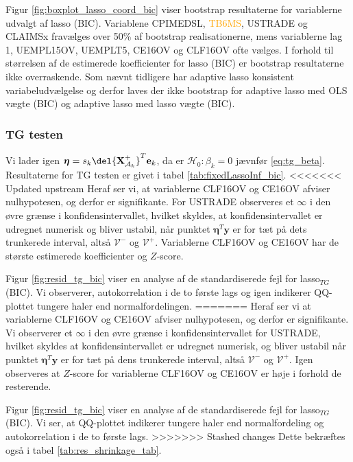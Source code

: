 Figur \ref{fig:boxplot_lasso_coord_bic} viser bootstrap resultaterne for variablerne udvalgt af lasso (BIC).
Variablene \textcolor{cadetblue2}{CPIMEDSL}, \textcolor{orange}{TB6MS}, \textcolor{blue3}{USTRADE} og \textcolor{blue3}{CLAIMSx} fravælges over 50\% af bootstrap realisationerne, mens variablerne \textcolor{blue3}{lag 1}, \textcolor{blue3}{UEMPL15OV}, \textcolor{blue3}{UEMPLT5}, \textcolor{blue3}{CE16OV} og \textcolor{blue3}{CLF16OV} ofte vælges.
I forhold til størrelsen af de estimerede koefficienter for lasso (BIC) er bootstrap resultaterne ikke overraskende. 
Som nævnt tidligere har adaptive lasso konsistent variabeludvælgelse og derfor laves der ikke bootstrap for adaptive lasso med OLS vægte (BIC) og adaptive lasso med lasso vægte (BIC). 

\subsubsection{TG testen}
Vi lader igen $\boldsymbol{\eta} = s_k \del{\textbf{X}^+_{\mathcal{A}_k}}^T \mathbf{e}_k$, da er $\mathcal{H}_0: \beta_k = 0$ jævnfør \eqref{eq:tg_beta}. 
Resultaterne for TG testen er givet i tabel \ref{tab:fixedLassoInf_bic}.
<<<<<<< Updated upstream
Heraf ser vi, at variablerne \textcolor{blue3}{CLF16OV} og \textcolor{blue3}{CE16OV} afviser nulhypotesen, og derfor er signifikante.
For \textcolor{blue3}{USTRADE} observeres et $\infty$ i den øvre grænse i konfidensintervallet, hvilket skyldes, at konfidensintervallet er udregnet numerisk og bliver ustabil, når punktet $\boldsymbol\eta^T \mathbf{y}$ er for tæt på dets trunkerede interval, altså $\mathcal{V}^-$ og $\mathcal{V}^+$. 
Variablerne \textcolor{blue3}{CLF16OV} og \textcolor{blue3}{CE16OV} har de største estimerede koefficienter og $Z$-score.

Figur \ref{fig:resid_tg_bic} viser en analyse af de standardiserede fejl for lasso$_{TG}$ (BIC). 
Vi observerer, autokorrelation i de to første lags og igen indikerer QQ-plottet tungere haler end normalfordelingen. 
=======
Heraf ser vi at variablerne \textcolor{blue3}{CLF16OV} og \textcolor{blue3}{CE16OV} afviser nulhypotesen, og derfor er signifikante.
Vi observerer et $\infty$ i den øvre grænse i konfidensintervallet for \textcolor{blue3}{USTRADE}, hvilket skyldes at konfidensintervallet er udregnet numerisk, og bliver ustabil når punktet $\boldsymbol\eta^T \mathbf{y}$ er for tæt på dens trunkerede interval, altså $\mathcal{V}^-$ og $\mathcal{V}^+$. 
Igen observeres at $Z$-score for variablerne \textcolor{blue3}{CLF16OV} og \textcolor{blue3}{CE16OV} er høje i forhold de resterende. 

Figur \ref{fig:resid_tg_bic} viser en analyse af de standardiserede fejl for lasso$_{TG}$ (BIC). Vi ser, at QQ-plottet indikerer tungere haler end normalfordeling og autokorrelation i de to første lags. 
>>>>>>> Stashed changes
Dette bekræftes også i tabel \ref{tab:res_shrinkage_tab}.




